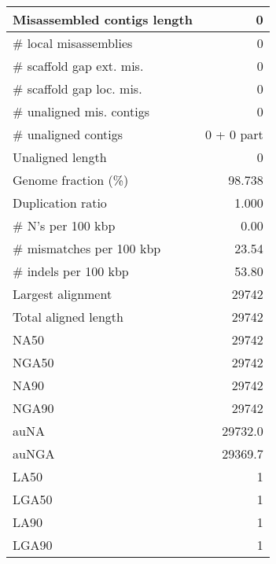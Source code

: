 \documentclass[12pt,a4paper]{article}
\begin{document}
\begin{table}[ht]
\begin{center}
\begin{tabular}{|l*{1}{|r}|}
Misassembled contigs length & 0 \\ \hline
\# local misassemblies & 0 \\ \hline
\# scaffold gap ext. mis. & 0 \\ \hline
\# scaffold gap loc. mis. & 0 \\ \hline
\# unaligned mis. contigs & 0 \\ \hline
\# unaligned contigs & 0 + 0 part \\ \hline
Unaligned length & 0 \\ \hline
Genome fraction (\%) & 98.738 \\ \hline
Duplication ratio & 1.000 \\ \hline
\# N's per 100 kbp & 0.00 \\ \hline
\# mismatches per 100 kbp & 23.54 \\ \hline
\# indels per 100 kbp & 53.80 \\ \hline
Largest alignment & 29742 \\ \hline
Total aligned length & 29742 \\ \hline
NA50 & 29742 \\ \hline
NGA50 & 29742 \\ \hline
NA90 & 29742 \\ \hline
NGA90 & 29742 \\ \hline
auNA & 29732.0 \\ \hline
auNGA & 29369.7 \\ \hline
LA50 & 1 \\ \hline
LGA50 & 1 \\ \hline
LA90 & 1 \\ \hline
LGA90 & 1 \\ \hline
\end{tabular}
\end{center}
\end{table}
\end{document}
